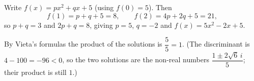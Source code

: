 Write $f(x)=px^2+qx+5$ (using $f(0)=5$). Then
\[f(1)=p+q+5=8,\qquad f(2)=4p+2q+5=21,\]
so $p+q=3$ and $2p+q=8$, giving $p=5$, $q=-2$ and $f(x)=5x^2-2x+5$.

By Vieta's formulas the product of the solutions is $\dfrac{5}{5}=\boxed{1}$. (The discriminant is $4-100=-96<0$, so the two solutions are the non-real numbers $\dfrac{1\pm2\sqrt6\,i}{5}$; their product is still $1$.)
